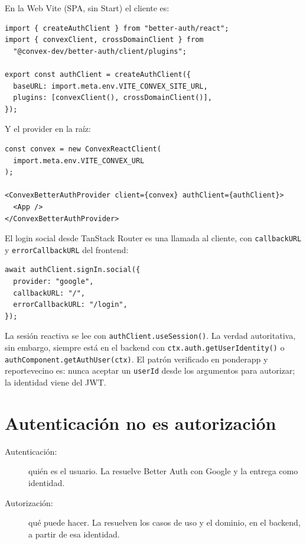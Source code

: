 \documentclass[11pt,a4paper]{article}
\begin{document}
En la Web Vite (SPA, sin Start) el cliente es:

\begin{lstlisting}
import { createAuthClient } from "better-auth/react";
import { convexClient, crossDomainClient } from
  "@convex-dev/better-auth/client/plugins";

export const authClient = createAuthClient({
  baseURL: import.meta.env.VITE_CONVEX_SITE_URL,
  plugins: [convexClient(), crossDomainClient()],
});
\end{lstlisting}

Y el provider en la raíz:

\begin{lstlisting}
const convex = new ConvexReactClient(
  import.meta.env.VITE_CONVEX_URL
);

<ConvexBetterAuthProvider client={convex} authClient={authClient}>
  <App />
</ConvexBetterAuthProvider>
\end{lstlisting}

El login social desde TanStack Router es una llamada al cliente, con
\texttt{callbackURL} y \texttt{errorCallbackURL} del frontend:

\begin{lstlisting}
await authClient.signIn.social({
  provider: "google",
  callbackURL: "/",
  errorCallbackURL: "/login",
});
\end{lstlisting}

La sesión reactiva se lee con \texttt{authClient.useSession()}. La verdad
autoritativa, sin embargo, siempre está en el backend con
\texttt{ctx.auth.getUserIdentity()} o
\texttt{authComponent.getAuthUser(ctx)}. El patrón verificado en ponderapp y
reportevecino es: nunca aceptar un \texttt{userId} desde los argumentos para
autorizar; la identidad viene del JWT.

\section{Autenticación no es autorización}

\begin{description}
  \item[Autenticación:] quién es el usuario. La resuelve Better Auth con
    Google y la entrega como identidad.
  \item[Autorización:] qué puede hacer. La resuelven los casos de uso y el
    dominio, en el backend, a partir de esa identidad.
\end{description}
\end{document}
